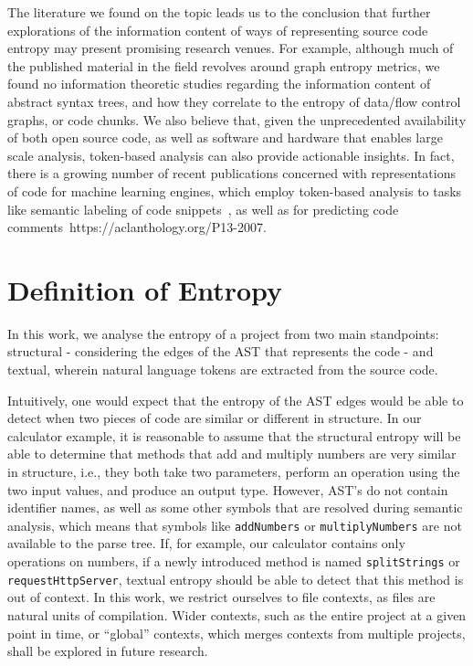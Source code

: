 \documentclass[10pt,conference]{IEEEtran}
\begin{document}
The literature we found on the topic leads us to the conclusion that further explorations of the information content of ways of representing source code entropy may present promising research venues. For example, although much of the published material in the field revolves around graph entropy metrics, we found no information theoretic studies regarding the information content of abstract syntax trees, and how they correlate to the entropy of data/flow control graphs, or code chunks. 
We also believe that, given the unprecedented availability of both open source code, as well as software and hardware that enables large scale analysis, token-based analysis can also provide actionable insights. In fact, there is a growing number of recent publications concerned with representations of code for machine learning engines, which employ token-based analysis to tasks like semantic labeling of code snippets~\cite{allamanis2016convolutional}, as well as for predicting code comments~https://aclanthology.org/P13-2007.

\section{Definition of Entropy} \label{definition}
In this work, we analyse the entropy of a project from two main standpoints: structural - considering the edges of the AST that represents the code - and textual, wherein natural language tokens are extracted from the source code.

Intuitively, one would expect that the entropy of the AST edges would be able to detect when two pieces of code are similar or different in structure. In our calculator example, it is reasonable to assume that the structural entropy will be able to determine that methods that add and multiply numbers are very similar in structure, i.e., they both take two parameters, perform an operation using the two input values, and produce an output type. However, AST's do not contain identifier names, as well as some other symbols that are resolved during semantic analysis, which means that symbols like \texttt{addNumbers} or \texttt{multiplyNumbers} are not available to the parse tree. If, for example, our calculator contains only operations on numbers, if a newly introduced method is named \texttt{splitStrings} or \texttt{requestHttpServer}, textual entropy should be able to detect that this method is out of context. In this work, we restrict ourselves to file contexts, as files are natural units of compilation. Wider contexts, such as the entire project at a given point in time, or ``global'' contexts, which merges contexts from multiple projects, shall be explored in future research.
\end{document}
